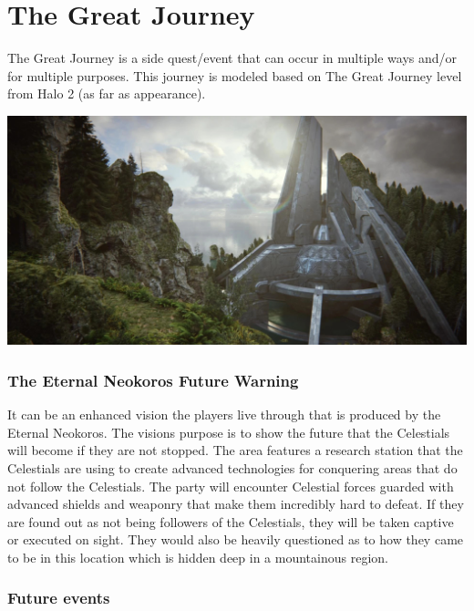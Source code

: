 \section{The Great Journey} \label{TheGreatJourney}

The Great Journey is a side quest/event that can occur in multiple ways and/or for multiple purposes. This journey is modeled based on The Great Journey level from Halo 2 (as far as appearance).

\begin{center}
	\includegraphics[width=\linewidth]{img/Halo/H2A_Mission_TheGreatJourney.jpg}
\end{center}

\subsubsection{The Eternal Neokoros Future Warning}

It can be an enhanced vision the players live through that is produced by the Eternal Neokoros. The visions purpose is to show the future that the Celestials will become if they are not stopped. The area features a research station that the Celestials are using to create advanced technologies for conquering areas that do not follow the Celestials. The party will encounter Celestial forces guarded with advanced shields and weaponry that make them incredibly hard to defeat. If they are found out as not being followers of the Celestials, they will be taken captive or executed on sight. They would also be heavily questioned as to how they came to be in this location which is hidden deep in a mountainous region. 

\subsubsection{Future events}

